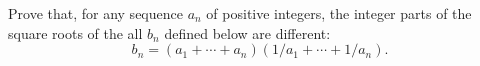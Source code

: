Prove that, for any sequence $a_n$ of positive integers, the integer parts of the square roots of the all $b_n$ defined below are different:
\[ b_n = (a_1 + \cdots + a_n)(1/a_1 + \cdots + 1/a_n). \]
